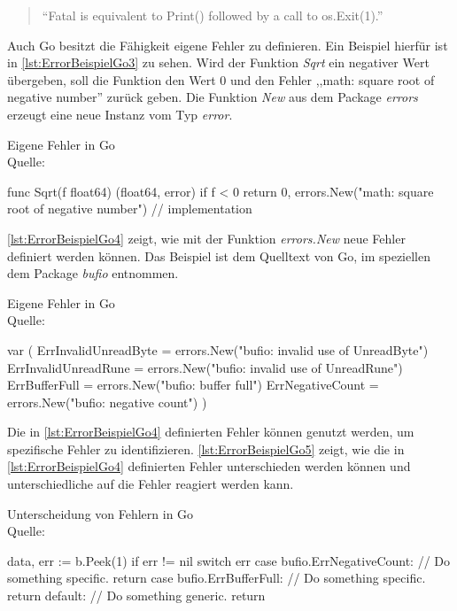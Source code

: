 \begin{quote}
\enquote{Fatal is equivalent to Print() followed by a call to os.Exit(1).} \cite[]{GoDoc.Log}
\end{quote}

Auch Go besitzt die Fähigkeit eigene Fehler zu definieren.
Ein Beispiel hierfür ist in \autoref{lst:ErrorBeispielGo3} zu sehen.
Wird der Funktion \textit{Sqrt} ein negativer Wert übergeben, soll die Funktion den Wert 0 und den Fehler ,,math: square root of negative number'' zurück geben. 
Die Funktion \textit{New} aus dem Package \textit{errors} erzeugt eine neue Instanz vom Typ \textit{error}.

\begin{listing}[H]
\caption{Eigene Fehler in Go \\ Quelle:\cite[]{GoBlog.ErroHandling}}
\label{lst:ErrorBeispielGo3}
\begin{GoCode}
func Sqrt(f float64) (float64, error) {
    if f < 0 {
        return 0, errors.New("math: square root of negative number")
    }
    // implementation
}
\end{GoCode}
\end{listing}

\autoref{lst:ErrorBeispielGo4} zeigt, wie mit der Funktion \textit{errors.New} neue Fehler definiert werden können. 
Das Beispiel ist dem Quelltext von Go, im speziellen dem Package \textit{bufio} entnommen.

\begin{listing}[H]
\caption{Eigene Fehler in Go \\ Quelle:\cite[]{GolangBufio}}
\label{lst:ErrorBeispielGo4}
\begin{GoCode}
var (
    ErrInvalidUnreadByte = errors.New("bufio: invalid use of UnreadByte")
    ErrInvalidUnreadRune = errors.New("bufio: invalid use of UnreadRune")
    ErrBufferFull        = errors.New("bufio: buffer full")
    ErrNegativeCount     = errors.New("bufio: negative count")
)
\end{GoCode}
\end{listing}

Die in \autoref{lst:ErrorBeispielGo4} definierten Fehler können genutzt werden, um spezifische Fehler zu identifizieren. 
\autoref{lst:ErrorBeispielGo5} zeigt, wie die in \autoref{lst:ErrorBeispielGo4} definierten Fehler unterschieden werden können und unterschiedliche auf die Fehler reagiert werden kann.

\begin{listing}[H]
\caption{Unterscheidung von Fehlern in Go \\ Quelle:\cite[]{GoingGo.Error1}}
\label{lst:ErrorBeispielGo5}
\begin{GoCode}
data, err := b.Peek(1)
if err != nil {
    switch err {
        case bufio.ErrNegativeCount:
            // Do something specific.
            return
        case bufio.ErrBufferFull:
            // Do something specific.
            return
        default:
            // Do something generic.
            return
    }
}
\end{GoCode}
\end{listing}

